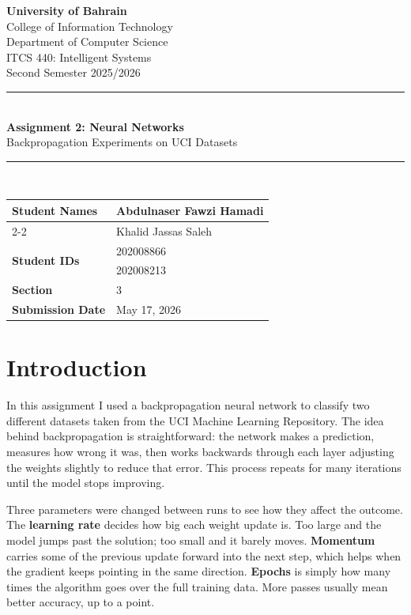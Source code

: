 \documentclass[12pt,a4paper]{article}
\begin{document}
\begin{center}
    {\Large\bfseries University of Bahrain}\\[4pt]
    College of Information Technology\\
    Department of Computer Science\\[6pt]
    {\large ITCS 440: Intelligent Systems}\\
    Second Semester 2025/2026\\[8pt]
    \rule{\linewidth}{0.8pt}\\[6pt]
    {\LARGE\bfseries Assignment 2: Neural Networks}\\[4pt]
    {\large Backpropagation Experiments on UCI Datasets}\\[6pt]
    \rule{\linewidth}{0.8pt}\\[10pt]
\end{center}

\noindent
\begin{tabular}{|l|p{9cm}|}
\hline
\multirow{2}{*}{\textbf{Student Names}} & Abdulnaser Fawzi Hamadi \\
\cline{2-2}
 & Khalid Jassas Saleh \\
\hline
\multirow{2}{*}{\textbf{Student IDs}} & 202008866 \\
\cline{2-2}
 & 202008213 \\
\hline
\textbf{Section}      & 3 \\
\hline
\textbf{Submission Date} & May 17, 2026 \\
\hline
\end{tabular}

\bigskip

\section{Introduction}

In this assignment I used a backpropagation neural network to classify two
different datasets taken from the UCI Machine Learning Repository. The idea
behind backpropagation is straightforward: the network makes a prediction,
measures how wrong it was, then works backwards through each layer adjusting
the weights slightly to reduce that error. This process repeats for many
iterations until the model stops improving.

Three parameters were changed between runs to see how they affect the outcome.
The \textbf{learning rate} decides how big each weight update is. Too large and
the model jumps past the solution; too small and it barely moves.
\textbf{Momentum} carries some of the previous update forward into the next
step, which helps when the gradient keeps pointing in the same direction.
\textbf{Epochs} is simply how many times the algorithm goes over the full
training data. More passes usually mean better accuracy, up to a point.
\end{document}
